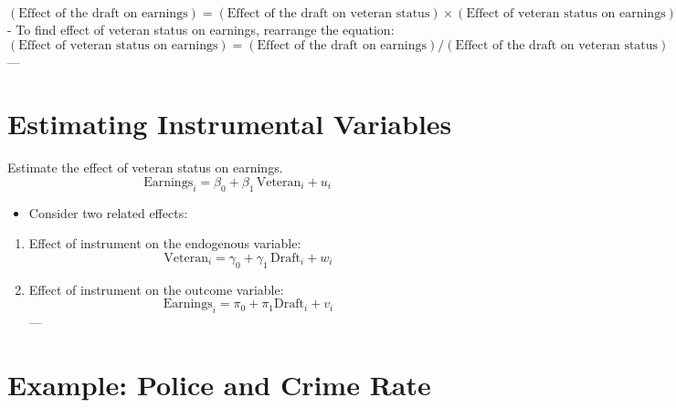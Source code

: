 \documentclass[
]{article}
\providecommand{\tightlist}{%
  \setlength{\itemsep}{0pt}\setlength{\parskip}{0pt}}
\begin{document}
\[
(\text{Effect of the draft on earnings}) =
(\text{Effect of the draft on veteran status})
\times 
(\text{Effect of veteran status on earnings})
\] - To find effect of veteran status on earnings, rearrange the
equation: \[
(\text{Effect of veteran status on earnings}) =
(\text{Effect of the draft on earnings})
/
(\text{Effect of the draft on veteran status})
\] ---

\hypertarget{estimating-instrumental-variables}{%
\section{Estimating Instrumental
Variables}\label{estimating-instrumental-variables}}

Estimate the effect of veteran status on earnings. \[
\text{Earnings}_i = \beta_0 + \beta_1 \, \text{Veteran}_i + u_i
\]

\begin{itemize}
\tightlist
\item
  Consider two related effects:
\end{itemize}

\begin{enumerate}
\def\labelenumi{\arabic{enumi}.}
\item
  Effect of instrument on the endogenous variable: \[
  \text{Veteran}_i = \gamma_0 + \gamma_1 \, \text{Draft}_i + w_i
  \]
\item
  Effect of instrument on the outcome variable: \[
  \text{Earnings}_i = \pi_0 + \pi_1 \text{Draft}_i + v_i
  \] ---
\end{enumerate}

\hypertarget{example-police-and-crime-rate}{%
\section{Example: Police and Crime
Rate}\label{example-police-and-crime-rate}}
\end{document}
